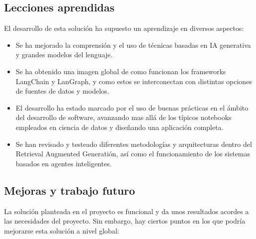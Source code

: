 \subsection{Lecciones aprendidas}

El desarrollo de esta solución ha supuesto un aprendizaje en diversos aspectos:

\begin{itemize}
    \item Se ha mejorado la comprensión y el uso de técnicas basadas en IA generativa y grandes modelos del lenguaje.
    \item Se ha obtenido una imagen global de como funcionan los frameworks LangChain y LanGraph, y como estos se interconectan con distintas opciones de fuentes de datos y modelos.
    \item El desarrollo ha estado marcado por el uso de buenas prácticas en el ámbito del desarrollo de software, avanzando mas allá de los típicos notebooks empleados en ciencia de datos y diseñando una aplicación completa.
    \item Se han revisado y testeado diferentes metodologías y arquitecturas dentro del Retrieval Augmented Generatión, así como el funcionamiento de los sistemas basados en agentes inteligentes.
\end{itemize}

\subsection{Mejoras y trabajo futuro}

La solución planteada en el proyecto es funcional y da unos resultados acordes a las necesidades del proyecto.
Sin embargo, hay ciertos puntos en los que podría mejorarse esta solución a nivel global:

